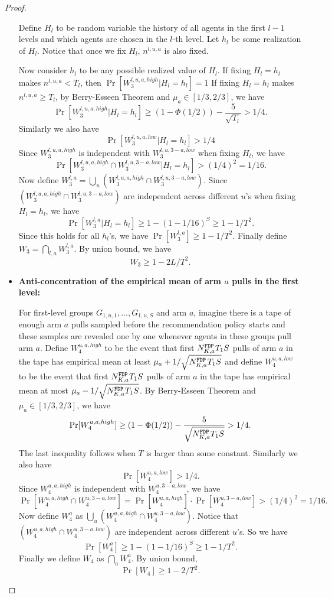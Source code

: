 \begin{proof}
\begin{itemize}
Define $H_l$ to be random variable the history of all agents in the first $l-1$ levels and which agents are chosen in the $l$-th level. Let $h_l$ be some realization of $H_l$. Notice that once we fix $H_l$, $n^{l,u,a}$ is also fixed. 

Now consider $h_l$ to be any possible realized value of $H_l$. If fixing $H_l= h_l$ makes $n^{l,u,a}<T_l$, then $\Pr[W_3^{l,u,a,high} |H_l = h_l]=1$  If fixing $H_l = h_l$ makes $n^{l,u,a} \geq T_l$, by Berry-Esseen Theorem and $\mu_a \in [1/3,2/3]$, we have
\[
\Pr[W_3^{l,u,a,high}|H_l = h_l] \geq (1-\Phi(1/2)) - \frac{5}{\sqrt{T_l}} > 1/4.
\]
Similarly we also have
\[
\Pr[W_3^{l,u,a,low}|H_l = h_l]  > 1/4
\]
Since $W_3^{l,u,a,high}$ is independent with $W_3^{l,u,3-a,low}$ when fixing $H_l$, we have
\[
\Pr[ W_3^{l,u,a,high} \cap W_3^{l,u,3-a,low}|H_l = h_l]  > (1/4)^2 = 1/16.
\]
Now define $W_3^{l,a} = \bigcup_u (W_3^{l,u,a,high} \cap W_3^{l,u,3-a,low})$. Since  $(W_3^{l,u,a,high} \cap W_3^{l,u,3-a,low})$ are independent across different $u$'s when fixing $H_l=h_l$, we have
\[
\Pr[W_3^{l,a}|H_l= h_l] \geq 1- (1-1/16)^S \geq 1 - 1/T^2.
\]
Since this holds for all $h_l$'s, we have $\Pr[W_3^{l,a}] \geq 1-1/T^2$. Finally define $W_3 = \bigcap_{l,a} W_3^{l,a}$. By union bound, we have
\[
W_3 \geq 1 - 2L/T^2.
\]

\item \textbf{Anti-concentration of the empirical mean of arm $a$ pulls in the first level:}

For first-level groups $G_{1,u,1},...,G_{1,u,S}$ and arm $a$, imagine there is a tape of enough arm $a$ pulls sampled before the recommendation policy starts and these samples are revealed one by one whenever agents in these groups pull arm $a$. Define $W_4^{u,a,high}$  to be the event that first $N^\mathtt{FDP}_{K,a} T_1 S$ pulls of arm $a$ in the tape has empirical mean at least $\mu_a + 1/\sqrt{N^\mathtt{FDP}_{K,a} T_1 S}$ and define $W_4^{u,a,low}$  to be the event that first $N^\mathtt{FDP}_{K,a} T_1S$ pulls of arm $a$ in the tape has empirical mean at most $\mu_a - 1/\sqrt{N^\mathtt{FDP}_{K,a} T_1S }$. By Berry-Esseen Theorem and $\mu_a \in [1/3,2/3]$, we have
\[
\Pr[W_4^{u,a,high}] \geq (1-\Phi(1/2)) - \frac{5}{\sqrt{N^\mathtt{FDP}_{K,a} T_1S}} > 1/4.
\]
The last inequality follows when $T$ is larger than some constant.
Similarly we also have 
\[
\Pr[W_4^{u,a,low}] > 1/4.
\]
Since $W_4^{u,a,high}$ is independent with $W_4^{u,3-a,low}$, we have
\[
\Pr[W_4^{u,a,high} \cap W_4^{u,3-a,low}] =\Pr[W_4^{u,a,high}] \cdot  \Pr[W_4^{u,3-a,low}]>(1/4)^2 = 1/16.
\]
Now define $W^{a}_4$ as $\bigcup_u (W_4^{u,a,high} \cap W_4^{u,3-a,low})$. Notice that $(W_4^{u,a,high} \cap W_4^{u,3-a,low})$ are independent across different $u$'s. So we have
\[
\Pr[W^{a}_4] \geq 1- (1-1/16)^S \geq 1 -1/T^2.
\]
Finally we define $W_4$ as $\bigcap_{a} W^{a}_4$. By union bound,
\[
\Pr[W_4] \geq 1- 2/T^2.
\]
\end{itemize}


\end{proof}
